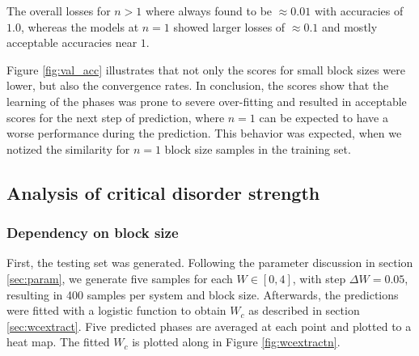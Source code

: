 \documentclass[reprint,amsmath,amssymb,aps,prb]{revtex4-2}
\begin{document}
The overall losses for $n>1$ where always found to be $\approx 0.01$ with accuracies of $1.0$, whereas the models at $n=1$ showed larger losses of  $\approx 0.1$ and mostly acceptable accuracies near $1$.%

Figure \ref{fig:val_acc} illustrates that not only the scores for small block sizes were lower, but also the convergence rates. In conclusion, the scores show that the learning of the phases was prone to severe over-fitting and resulted in acceptable scores for the next step of prediction, where $n=1$ can be expected to have a worse performance during the prediction. This behavior was expected, when we notized the similarity for $n=1$ block size samples in the training set.

\subsection{Analysis of critical disorder strength}
\subsubsection{Dependency on block size}
First, the testing set was generated. Following the parameter discussion in section \ref{sec:param}, we generate five samples for each $W\in\left[0,4\right]$, with step $\Delta W=0.05$, resulting in 400 samples per system and block size. Afterwards, the predictions were fitted with a logistic function to obtain $W_c$ as described in section \ref{sec:wcextract}.
Five predicted phases are averaged at each point and plotted to a heat map. The fitted $W_c$ is plotted along in Figure \ref{fig:wcextractn}.
\end{document}
